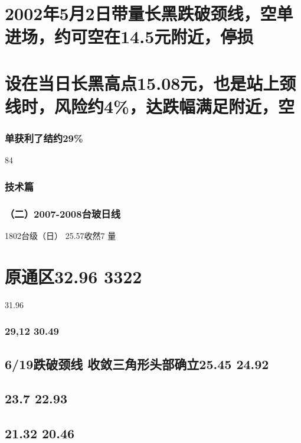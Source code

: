 \documentclass{article}
\begin{document}
\section{2002年5月2日带量长黑跌破颈线，空单进场，约可空在14.5元附近，停损}

\section{设在当日长黑高点15.08元，也是站上颈线时，风险约4\%，达跌幅满足附近，空}

\subsubsection{单获利了结约29\%}

84

\clearpage

\subsubsection{技术篇}

\subsubsection{（二）2007-2008台玻日线}

1802台级（日） 25.57收然7 量

\section{原通区32.96 3322}

31.96

\subsubsection{29,12 30.49}

\subsection{6/19跌破颈线 收敛三角形头部确立25.45 24.92}

\subsection{23.7 22.93}

\subsection{21.32 20.46}
\end{document}
